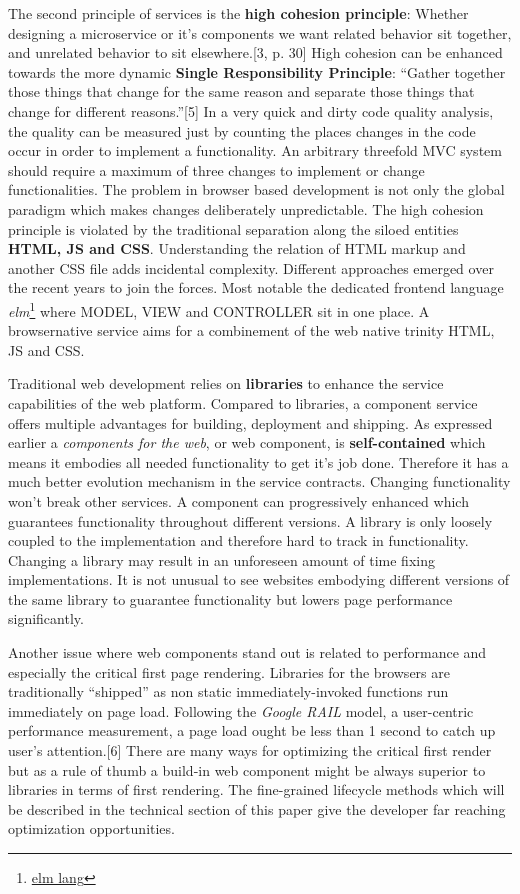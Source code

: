 \documentclass[]{article}
\begin{document}
The second principle of services is the \textbf{high cohesion
principle}: Whether designing a microservice or it's components we want
related behavior sit together, and unrelated behavior to sit
elsewhere.{[}3, p. 30{]} High cohesion can be enhanced towards the more
dynamic \textbf{Single Responsibility Principle}: ``Gather together
those things that change for the same reason and separate those things
that change for different reasons.''{[}5{]} In a very quick and dirty
code quality analysis, the quality can be measured just by counting the
places changes in the code occur in order to implement a functionality.
An arbitrary threefold MVC system should require a maximum of three
changes to implement or change functionalities. The problem in browser
based development is not only the global paradigm which makes changes
deliberately unpredictable. The high cohesion principle is violated by
the traditional separation along the siloed entities \textbf{HTML, JS
and CSS}. Understanding the relation of HTML markup and another CSS file
adds incidental complexity. Different approaches emerged over the recent
years to join the forces. Most notable the dedicated frontend language
\emph{elm}\footnote{\href{http://elm-lang.org/}{elm lang}} where MODEL,
VIEW and CONTROLLER sit in one place. A browsernative service aims for a
combinement of the web native trinity HTML, JS and CSS.

Traditional web development relies on \textbf{libraries} to enhance the
service capabilities of the web platform. Compared to libraries, a
component service offers multiple advantages for building, deployment
and shipping. As expressed earlier a \emph{components for the web}, or
web component, is \textbf{self-contained} which means it embodies all
needed functionality to get it's job done. Therefore it has a much
better evolution mechanism in the service contracts. Changing
functionality won't break other services. A component can progressively
enhanced which guarantees functionality throughout different versions. A
library is only loosely coupled to the implementation and therefore hard
to track in functionality. Changing a library may result in an
unforeseen amount of time fixing implementations. It is not unusual to
see websites embodying different versions of the same library to
guarantee functionality but lowers page performance significantly.

Another issue where web components stand out is related to performance
and especially the critical first page rendering. Libraries for the
browsers are traditionally ``shipped'' as non static immediately-invoked
functions run immediately on page load. Following the \emph{Google RAIL}
model, a user-centric performance measurement, a page load ought be less
than 1 second to catch up user's attention.{[}6{]} There are many ways
for optimizing the critical first render but as a rule of thumb a
build-in web component might be always superior to libraries in terms of
first rendering. The fine-grained lifecycle methods which will be
described in the technical section of this paper give the developer far
reaching optimization opportunities.
\end{document}
